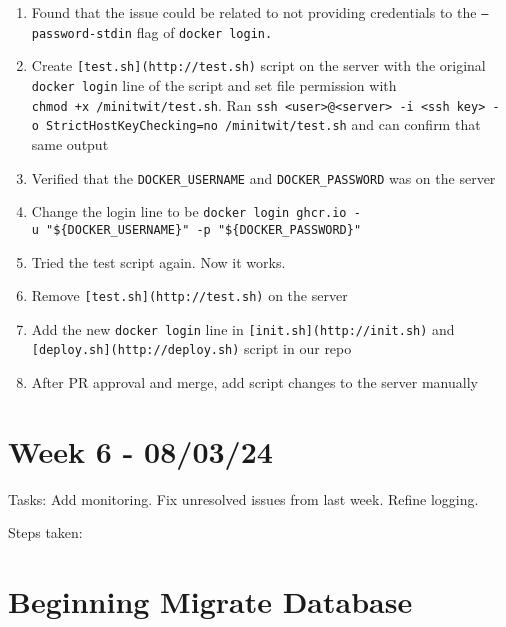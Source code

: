\begin{enumerate}
    \item Found that the issue could be related to not providing credentials to the \texttt{—password-stdin} flag of \texttt{docker\ login.}
    \item Create \texttt{{[}test.sh{]}(http://test.sh)} script on the server with the original \texttt{docker\ login} line of the script and set file permission with \texttt{chmod\ +x\ /minitwit/test.sh}. Ran \texttt{ssh\ \textless{}user\textgreater{}@\textless{}server\textgreater{}\ -i\ \textless{}ssh\ key\textgreater{}\ -o\ StrictHostKeyChecking=no\ \textquotesingle{}/minitwit/test.sh\textquotesingle{}} and can confirm that same output
    \item Verified that the \texttt{DOCKER\_USERNAME} and \texttt{DOCKER\_PASSWORD} was on the server
    \item Change the login line to be \texttt{docker\ login\ ghcr.io\ -u\ "\$\{DOCKER\_USERNAME\}"\ -p\ "\$\{DOCKER\_PASSWORD\}"}
    \item Tried the test script again. Now it works.
    \item Remove \texttt{{[}test.sh{]}(http://test.sh)} on the server
    \item Add the new \texttt{docker\ login} line in \texttt{{[}init.sh{]}(http://init.sh)} and \texttt{{[}deploy.sh{]}(http://deploy.sh)} script in our repo
    \item After PR approval and merge, add script changes to the server manually
\end{enumerate}

\section{Week 6 - 08/03/24}
\label{log:week6}

Tasks: Add monitoring. Fix unresolved issues from last week. Refine
logging.

Steps taken:

\section{Beginning Migrate Database}
\label{log:beginning-migrate-database}

